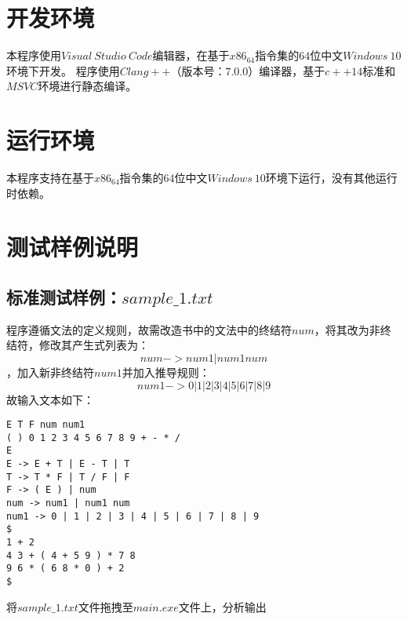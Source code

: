 \documentclass[UTF8]{ctexart}
\begin{document}
\section{开发环境}
本程序使用$Visual \ Studio \ Code$编辑器，在基于$x86_64$指令集的$64$位中文$Windows \ 10$环境下开发。
程序使用$Clang++$（版本号：$7.0.0$）编译器，基于$c++14$标准和$MSVC$环境进行静态编译。
\section{运行环境}
本程序支持在基于$x86_64$指令集的$64$位中文$Windows \ 10$环境下运行，没有其他运行时依赖。
\section{测试样例说明}
\subsection{标准测试样例：$sample\_1.txt$}
程序遵循文法的定义规则，故需改造书中的文法中的终结符$num$，将其改为非终结符，修改其产生式列表为：
$$ num -> num1 | num1 num $$
，加入新非终结符$num1$并加入推导规则：
$$ num1 -> 0 | 1 | 2 | 3 | 4 | 5 | 6 | 7 | 8 | 9 $$
故输入文本如下：
\begin{lstlisting}
E T F num num1
( ) 0 1 2 3 4 5 6 7 8 9 + - * /
E
E -> E + T | E - T | T
T -> T * F | T / F | F
F -> ( E ) | num
num -> num1 | num1 num
num1 -> 0 | 1 | 2 | 3 | 4 | 5 | 6 | 7 | 8 | 9
$
1 + 2
4 3 + ( 4 + 5 9 ) * 7 8
9 6 * ( 6 8 * 0 ) + 2
$
    \end{lstlisting}
将$sample\_1.txt$文件拖拽至$main.exe$文件上，分析输出 \\
\end{document}
